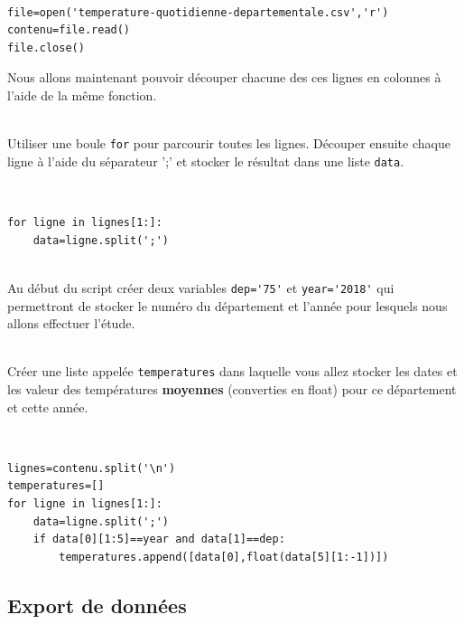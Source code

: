 \begin{solution}~\ \\
\begin{verbatim}
file=open('temperature-quotidienne-departementale.csv','r')
contenu=file.read()
file.close()
\end{verbatim}
\end{solution}

Nous allons maintenant pouvoir découper chacune des ces lignes en colonnes à l'aide de la même fonction.

\begin{exercice}~\\
Utiliser une boule \verb?for? pour parcourir toutes les lignes. Découper ensuite chaque ligne à l'aide du séparateur ';' et stocker le résultat dans une liste \verb?data?.
\end{exercice}

\begin{solution}~\ \\
\begin{verbatim}
for ligne in lignes[1:]:
    data=ligne.split(';')
\end{verbatim}
\end{solution}

\begin{exercice}~\\
Au début du script créer deux variables \verb?dep='75'? et \verb?year='2018'? qui permettront de stocker le numéro du département et l'année pour lesquels nous allons effectuer l'étude.
\end{exercice}

\begin{exercice}~\\
Créer une liste appelée \verb?temperatures? dans laquelle vous allez stocker les dates et les valeur des températures \textbf{moyennes} (converties en float) pour ce département et cette année.
\end{exercice}

\begin{solution}~\ \\
\begin{verbatim}
lignes=contenu.split('\n')
temperatures=[]
for ligne in lignes[1:]:
    data=ligne.split(';')
    if data[0][1:5]==year and data[1]==dep:
        temperatures.append([data[0],float(data[5][1:-1])])
\end{verbatim}
\end{solution}

\subsection{Export de données}

